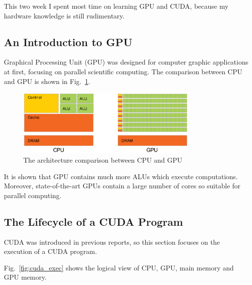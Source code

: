 \documentclass[11pt]{article}
\begin{document}
This two week I spent most time on learning GPU and CUDA, because my hardware knowledge is still rudimentary.

\subsection{An Introduction to GPU}

Graphical Processing Unit (GPU) was designed for computer graphic applications at first, focusing on parallel scientific computing. The comparison between CPU and GPU is shown in Fig.~\ref{fig:gpuvscpu}.

\begin{figure}[h]
    \centering
    \includegraphics[width=0.8\textwidth]{gpuvscpu.eps}
    \caption{The architecture comparison between CPU and GPU}
    \label{fig:gpuvscpu}
\end{figure}

It is shown that GPU contains much more ALUs which execute computations. Moreover, state-of-the-art GPUs contain a large number of cores so suitable for parallel computing. 

\subsection{The Lifecycle of a CUDA Program}

CUDA was introduced in previous reports, so this section focuses on the execution of a CUDA program.

Fig.~\ref{fig:cuda_exec} shows the logical view of CPU, GPU, main memory and GPU memory.
\end{document}
